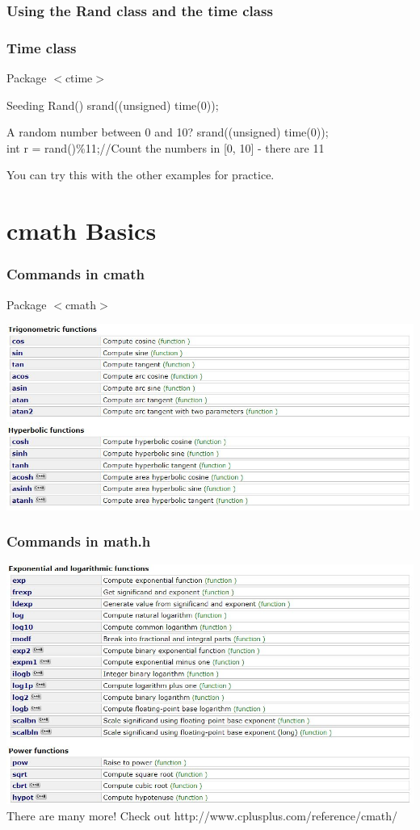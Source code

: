 \documentclass{if-beamer}
\begin{document}
\begin{frame}
\frametitle{Using the Rand class and the time class}
	\frametitle{Time class}
	\begin{block}{Package}
		$<$ctime$>$
	\end{block}
	\begin{block}{Seeding Rand()}
		srand((unsigned) time(0));
	\end{block}
	\begin{block}{A random number between 0 and 10?}
		srand((unsigned) time(0));\\
		int r = rand()\%11;\qquad \qquad  //Count the numbers in [0, 10] - there are 11
	\end{block}
	\vspace{5pt}
	You can try this with the other examples for practice.
\end{frame}

\section{cmath Basics}

\begin{frame}
	\frametitle{Commands in cmath}
	\begin{block}{Package}
		$<$cmath$>$
	\end{block}
	\includegraphics[width = .9\textwidth]{figures/math1}		
\end{frame}

\begin{frame}
\frametitle{Commands in math.h}
\includegraphics[width = .9\textwidth]{figures/math2} \\
\vspace{5pt}
There are many more! Check out http://www.cplusplus.com/reference/cmath/		
\end{frame}
\end{document}
